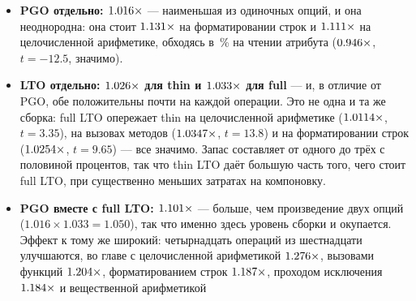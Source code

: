 \begin{itemize}[leftmargin=1.4em,itemsep=1pt]
  \item \textbf{PGO отдельно: $\meas{geomean:b5_buildcfg-plain|b5_buildcfg-pgo}{1.016}\times$} --- наименьшая из одиночных опций, и она неоднородна:
        она стоит $\meas{ratio:b5_buildcfg-plain:str_format_join/plain|b5_buildcfg-pgo:str_format_join/pgo}{1.131}\times$ на форматировании строк и $\meas{ratio:b5_buildcfg-plain:int_arith/plain|b5_buildcfg-pgo:int_arith/pgo}{1.111}\times$ на целочисленной
        арифметике, обходясь в \,\% на чтении атрибута ($\meas{ratio:b5_buildcfg-plain:attr_get/plain|b5_buildcfg-pgo:attr_get/pgo}{0.946}\times$, $t=-12.5$, значимо).
  \item \textbf{LTO отдельно: $\meas{geomean:b5_buildcfg-plain|b5_buildcfg-ltothin}{1.026}\times$ для thin и $\meas{geomean:b5_buildcfg-plain|b5_buildcfg-ltofull}{1.033}\times$ для full} --- и, в отличие от
        PGO, обе положительны почти на каждой операции. Это не одна и та же сборка: full LTO
        опережает thin на целочисленной арифметике ($\meas{ratio:b5_buildcfg-ltothin:int_arith/ltothin|b5_buildcfg-ltofull:int_arith/ltofull}{1.0114}\times$, $t=3.35$), на вызовах методов
        ($\meas{ratio:b5_buildcfg-ltothin:method_call/ltothin|b5_buildcfg-ltofull:method_call/ltofull}{1.0347}\times$, $t=13.8$) и на форматировании строк ($\meas{ratio:b5_buildcfg-ltothin:str_format_join/ltothin|b5_buildcfg-ltofull:str_format_join/ltofull}{1.0254}\times$, $t=9.65$) --- все
        значимо. Запас составляет от одного до трёх с половиной процентов, так что thin LTO даёт большую часть того,
        чего стоит full LTO, при существенно меньших затратах на компоновку.
  \item \textbf{PGO вместе с full LTO: $\meas{geomean:b5_buildcfg-plain|b5_buildcfg-pgo_ltofull}{1.101}\times$} --- больше, чем произведение двух опций
        ($1.016 \times 1.033 = 1.050$), так что именно здесь уровень сборки и окупается.
        Эффект к тому же широкий: четырнадцать операций из шестнадцати улучшаются, во главе с
        целочисленной арифметикой $\meas{ratio:b5_buildcfg-plain:int_arith/plain|b5_buildcfg-pgo_ltofull:int_arith/pgo_ltofull}{1.276}\times$, вызовами функций $\meas{ratio:b5_buildcfg-plain:func_call/plain|b5_buildcfg-pgo_ltofull:func_call/pgo_ltofull}{1.204}\times$, форматированием
        строк $\meas{ratio:b5_buildcfg-plain:str_format_join/plain|b5_buildcfg-pgo_ltofull:str_format_join/pgo_ltofull}{1.187}\times$, проходом исключения $\meas{ratio:b5_buildcfg-plain:exception_roundtrip/plain|b5_buildcfg-pgo_ltofull:exception_roundtrip/pgo_ltofull}{1.184}\times$ и вещественной арифметикой

\end{itemize}
